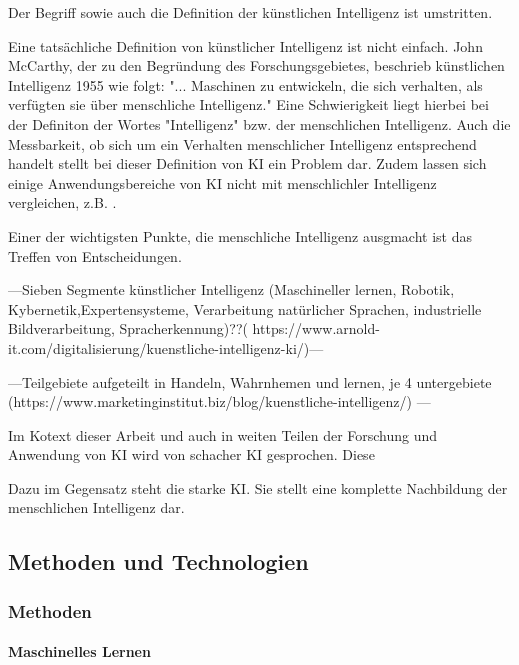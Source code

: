 \documentclass[a4paper,12pt, german]{report}
\begin{document}
Der Begriff sowie auch die Definition der künstlichen Intelligenz ist umstritten. 

Eine tatsächliche Definition von künstlicher Intelligenz ist nicht einfach. 
John McCarthy, der zu den Begründung des Forschungsgebietes, beschrieb künstlichen Intelligenz 1955 wie folgt: "... Maschinen zu entwickeln, die sich verhalten, als verfügten sie über menschliche Intelligenz."
Eine Schwierigkeit liegt hierbei bei der Definiton der Wortes "Intelligenz" bzw. der menschlichen Intelligenz. Auch die Messbarkeit, ob sich um ein Verhalten menschlicher Intelligenz entsprechend handelt stellt bei dieser Definition von KI ein Problem dar.
Zudem lassen sich einige Anwendungsbereiche von KI nicht mit menschlichler Intelligenz vergleichen, z.B. .

Einer der wichtigsten Punkte, die menschliche Intelligenz ausgmacht ist das Treffen von Entscheidungen. \cite{01} %

---Sieben Segmente künstlicher Intelligenz (Maschineller lernen, Robotik, Kybernetik,Expertensysteme, Verarbeitung natürlicher Sprachen, industrielle Bildverarbeitung, Spracherkennung)??( https://www.arnold-it.com/digitalisierung/kuenstliche-intelligenz-ki/)---

---Teilgebiete aufgeteilt in Handeln, Wahrnhemen und lernen, je 4 untergebiete (https://www.marketinginstitut.biz/blog/kuenstliche-intelligenz/) ---


Im Kotext dieser Arbeit und auch in weiten Teilen der Forschung und Anwendung von KI wird von schacher KI gesprochen. Diese 

Dazu im Gegensatz steht die starke KI. Sie stellt eine komplette Nachbildung der menschlichen Intelligenz dar. 

\subsection{Methoden und Technologien}

\subsubsection{Methoden}

\paragraph{Maschinelles Lernen}
\end{document}
